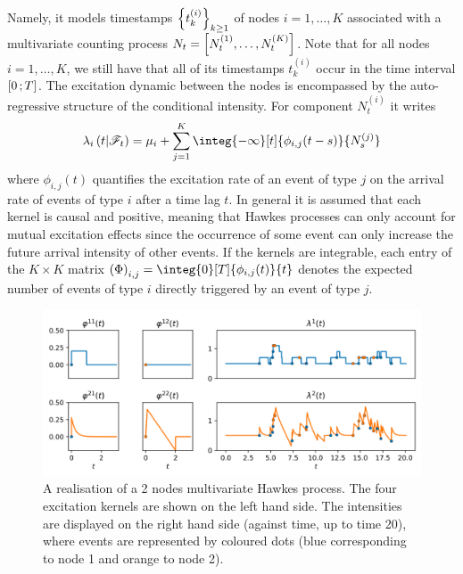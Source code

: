 Namely, it models timestamps $\left\lbrace t_k^{(i)} \right\rbrace_{k\geq 1}$ of nodes $i=1,\dots,K$ associated with a multivariate counting process $N_t = \left\lbrack N_t^{(1)}, \dots, N_t^{(K)} \right\rbrack$.
Note that for all nodes $i=1,\dots,K$, we still have that all of its timestamps $t_k^{(i)}$ occur in the time interval $\left[ 0 \, ; T \right]$.
The excitation dynamic between the nodes is encompassed by the auto-regressive structure of the conditional intensity.
For component $N_t^{(i)}$ it writes
\begin{equation}
    \lambda_i\pars{t \middle| \mathscr{F}_t} = \mu_i + \sum_{j=1}^K  \integ{-\infty}[t]{\phi_{i,j}(t-s)}{N_s^{(j)}}
\end{equation}
where $\phi_{i,j}(t)$ quantifies the excitation rate of an event of type $j$ on the arrival rate of events of type $i$ after a time lag $t$.
In general it is assumed that each kernel is causal and positive, meaning that Hawkes processes can only account for mutual excitation effects since the occurrence of some event can only increase the future arrival intensity of other events.
If the kernels are integrable, each entry of the $K\times K$ matrix ${\pars{\Phi}_{i,j} = \integ{0}[T]{\phi_{i,j}(t)}{t}}$ denotes the expected number of events of type $i$ directly triggered by an event of type $j$.

\begin{figure}[h]
    \centering
    \includegraphics[scale=0.35]{pics/simu_multi_hawkes.png}
    \caption{A realisation of a 2 nodes multivariate Hawkes process. The four excitation kernels are shown on the left hand side. The intensities are displayed on the right hand side (against time, up to time 20), where events are represented by coloured dots (blue corresponding to node 1 and orange to node 2).}
\end{figure}

